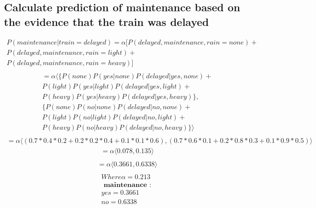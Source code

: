 \documentclass[16pt, A4Paper]{article}
\begin{document}
\subsection*{Calculate prediction of maintenance based on the evidence that the train was delayed}
\begin{multline*}
P(maintenance | train=delayed) = \alpha [ P(delayed , maintenance , rain = none )+ \\
P(delayed , maintenance , rain = light)+ \\
P(delayed , maintenance , rain = heavy) ] \\
\end{multline*}
\begin{multline*}
= \alpha \langle \{ P (none) P(yes | none) P(delayed | yes , none) +\\ P(light) P(yes | light) P(delayed | yes , light) +\\
P(heavy) P(yes | heavy) P(delayed | yes , heavy) \} ,\\ \{ P(none) P(no | none) P(delayed | no , none) +\\
P(light) P(no | light) P(delayed | no , light) + \\ P(heavy) P(no | heavy) P(delayed | no , heavy) \}  \rangle \\
\end{multline*}
\begin{multline*}
= \alpha \langle  (0.7 * 0.4 * 0.2 + 0.2 * 0.2 * 0.4 + 0.1 * 0.1 * 0.6) , ( 0.7 * 0.6 * 0.1 + 0.2 * 0.8 * 0.3 + 0.1 * 0.9 * 0.5  )  \rangle
\end{multline*}
\begin{multline*}
= \alpha \langle  0.078 , 0.135  \rangle \\
\end{multline*}
\begin{multline*}
= \alpha \langle  0.3661 , 0.6338  \rangle \\
\end{multline*}
\begin{multline*}
  Where \alpha = 0.213 \\
 \textbf{ maintenance : }\\
  yes = 0.3661 \\
  no = 0.6338 \\
\end{multline*}
\end{document}
